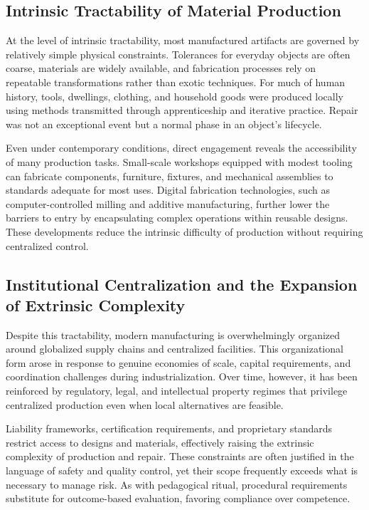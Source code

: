 \documentclass[11pt]{article}
\begin{document}
\subsection{Intrinsic Tractability of Material Production}

At the level of intrinsic tractability, most manufactured artifacts are governed by relatively simple physical constraints. Tolerances for everyday objects are often coarse, materials are widely available, and fabrication processes rely on repeatable transformations rather than exotic techniques. For much of human history, tools, dwellings, clothing, and household goods were produced locally using methods transmitted through apprenticeship and iterative practice. Repair was not an exceptional event but a normal phase in an object’s lifecycle.

Even under contemporary conditions, direct engagement reveals the accessibility of many production tasks. Small-scale workshops equipped with modest tooling can fabricate components, furniture, fixtures, and mechanical assemblies to standards adequate for most uses. Digital fabrication technologies, such as computer-controlled milling and additive manufacturing, further lower the barriers to entry by encapsulating complex operations within reusable designs. These developments reduce the intrinsic difficulty of production without requiring centralized control.

\subsection{Institutional Centralization and the Expansion of Extrinsic Complexity}

Despite this tractability, modern manufacturing is overwhelmingly organized around globalized supply chains and centralized facilities. This organizational form arose in response to genuine economies of scale, capital requirements, and coordination challenges during industrialization. Over time, however, it has been reinforced by regulatory, legal, and intellectual property regimes that privilege centralized production even when local alternatives are feasible.

Liability frameworks, certification requirements, and proprietary standards restrict access to designs and materials, effectively raising the extrinsic complexity of production and repair. These constraints are often justified in the language of safety and quality control, yet their scope frequently exceeds what is necessary to manage risk. As with pedagogical ritual, procedural requirements substitute for outcome-based evaluation, favoring compliance over competence.
\end{document}

